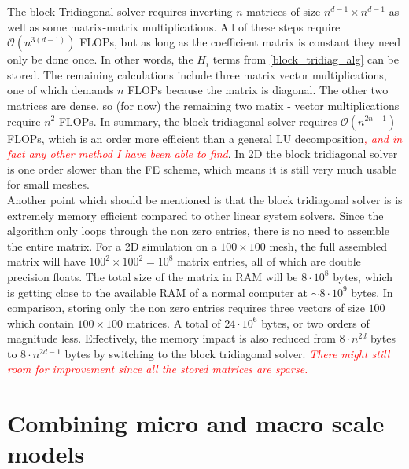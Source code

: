 The block Tridiagonal solver requires inverting $n$ matrices of size $n^{d-1}\times n^{d-1}$ as well as some matrix-matrix multiplications. 
All of these steps require $\mathcal O(n^{3(d-1)})$ FLOPs, but as long as the coefficient matrix is constant they need only be done once. 
In other words, the $H_i$ terms from \eqref{block_tridiag_alg} can be stored. 
The remaining calculations include three matrix vector multiplications, one of which demands $n$ FLOPs because the matrix is diagonal. 
The other two matrices are dense, so (for now) the remaining two matix - vector multiplications require $n^2$ FLOPs. 
In summary, the block tridiagonal solver requires $\mathcal{O}(n^{2n-1})$ FLOPs, which is an order more efficient than a general LU decomposition\emph{\textcolor{red}{, and in fact any other method I have been able to find}}. 
In 2D the block tridiagonal solver is one order slower than the FE scheme, which means it is still very much usable for small meshes. \\

Another point which should be mentioned is that the block tridiagonal solver is is extremely memory efficient compared to other linear system solvers. 
Since the algorithm only loops through the non zero entries, there is no need to assemble the entire matrix. 
For a 2D simulation on a $100\times 100$ mesh, the full assembled matrix will have $100^2\times100^2 = 10^8$ matrix entries, all of which are double precision floats. 
The total size of the matrix in RAM will be $8\cdot10^8$ bytes, which is getting close to the available RAM of a normal computer at  $\sim 8\cdot10^9$ bytes. 
In comparison, storing only the non zero entries requires three vectors of size $100$ which contain $100\times100$ matrices. A total of $24\cdot10^6$ bytes, or two orders of magnitude less. 
Effectively, the memory impact is also reduced from $8\cdot n^{2d}$ bytes to $8\cdot n^{2d-1}$ bytes by switching to the block tridiagonal solver. 
\emph{\textcolor{red}{There might still room for improvement since all the stored matrices are sparse.}}

\section{Combining micro and macro scale models}

